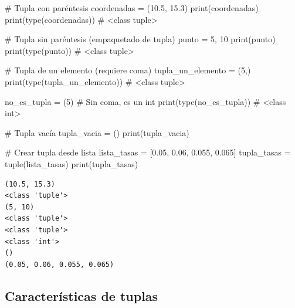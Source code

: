 \documentclass[
  doc,
  floatsintext,
  longtable,
  a4paper,
  nolmodern,
  notxfonts,
  notimes,
  12pt,
  colorlinks=true,linkcolor=blue,citecolor=blue,urlcolor=blue]{apa7}
\newenvironment{Shaded}{\begin{snugshade}}{\end{snugshade}}
\newcommand{\BuiltInTok}[1]{\textcolor[rgb]{0.00,0.23,0.31}{#1}}
\newcommand{\CommentTok}[1]{\textcolor[rgb]{0.37,0.37,0.37}{#1}}
\newcommand{\DecValTok}[1]{\textcolor[rgb]{0.68,0.00,0.00}{#1}}
\newcommand{\FloatTok}[1]{\textcolor[rgb]{0.68,0.00,0.00}{#1}}
\newcommand{\NormalTok}[1]{\textcolor[rgb]{0.00,0.23,0.31}{#1}}
\newcommand{\OperatorTok}[1]{\textcolor[rgb]{0.37,0.37,0.37}{#1}}
\begin{document}
\begin{Shaded}
\begin{Highlighting}[]
\CommentTok{\# Tupla con paréntesis}
\NormalTok{coordenadas }\OperatorTok{=}\NormalTok{ (}\FloatTok{10.5}\NormalTok{, }\FloatTok{15.3}\NormalTok{)}
\BuiltInTok{print}\NormalTok{(coordenadas)}
\BuiltInTok{print}\NormalTok{(}\BuiltInTok{type}\NormalTok{(coordenadas))  }\CommentTok{\# \textless{}class \textquotesingle{}tuple\textquotesingle{}\textgreater{}}

\CommentTok{\# Tupla sin paréntesis (empaquetado de tupla)}
\NormalTok{punto }\OperatorTok{=} \DecValTok{5}\NormalTok{, }\DecValTok{10}
\BuiltInTok{print}\NormalTok{(punto)}
\BuiltInTok{print}\NormalTok{(}\BuiltInTok{type}\NormalTok{(punto))  }\CommentTok{\# \textless{}class \textquotesingle{}tuple\textquotesingle{}\textgreater{}}

\CommentTok{\# Tupla de un elemento (requiere coma)}
\NormalTok{tupla\_un\_elemento }\OperatorTok{=}\NormalTok{ (}\DecValTok{5}\NormalTok{,)}
\BuiltInTok{print}\NormalTok{(}\BuiltInTok{type}\NormalTok{(tupla\_un\_elemento))  }\CommentTok{\# \textless{}class \textquotesingle{}tuple\textquotesingle{}\textgreater{}}

\NormalTok{no\_es\_tupla }\OperatorTok{=}\NormalTok{ (}\DecValTok{5}\NormalTok{)  }\CommentTok{\# Sin coma, es un int}
\BuiltInTok{print}\NormalTok{(}\BuiltInTok{type}\NormalTok{(no\_es\_tupla))  }\CommentTok{\# \textless{}class \textquotesingle{}int\textquotesingle{}\textgreater{}}

\CommentTok{\# Tupla vacía}
\NormalTok{tupla\_vacia }\OperatorTok{=}\NormalTok{ ()}
\BuiltInTok{print}\NormalTok{(tupla\_vacia)}

\CommentTok{\# Crear tupla desde lista}
\NormalTok{lista\_tasas }\OperatorTok{=}\NormalTok{ [}\FloatTok{0.05}\NormalTok{, }\FloatTok{0.06}\NormalTok{, }\FloatTok{0.055}\NormalTok{, }\FloatTok{0.065}\NormalTok{]}
\NormalTok{tupla\_tasas }\OperatorTok{=} \BuiltInTok{tuple}\NormalTok{(lista\_tasas)}
\BuiltInTok{print}\NormalTok{(tupla\_tasas)}
\end{Highlighting}
\end{Shaded}

\begin{verbatim}
(10.5, 15.3)
<class 'tuple'>
(5, 10)
<class 'tuple'>
<class 'tuple'>
<class 'int'>
()
(0.05, 0.06, 0.055, 0.065)
\end{verbatim}

\subsection{Características de
tuplas}\label{caracteruxedsticas-de-tuplas}
\end{document}

